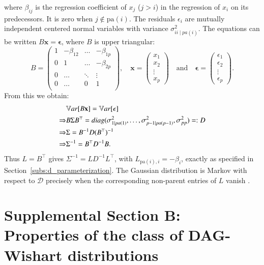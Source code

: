 \documentclass[12pt]{article}
\newcommand{\D}{\mathcal{D}}
\theoremstyle{plain}
\theoremstyle{definition}
\theoremstyle{remark}
\begin{document}
where \(\beta_{ij}\) is the regression coefficient of \(x_j\)
(\(j>i\)) in the regression of \(x_i\) on its predecessors.  It is
zero when \(j\notin\mathrm{pa}(i)\).  The residuals \(\epsilon_i\) are
mutually independent centered normal variables with variance
\(\sigma^2_{ii\mid pa(i)}\).  The equations can be written
\(B\mathbf{x}=\boldsymbol{\epsilon}\), where \(B\) is upper triangular:
\[
B=
\left(
\begin{matrix}
1& -\beta_{12}&\ldots& -\beta_{1p}\\
  0&1 &\ldots &-\beta_{2p}\\
  0&\ldots&\ddots&\vdots \\
 0 &\ldots&0 & 1\\
  \end{matrix}
\right)
,\quad \mathbf{x}=\left(\begin{matrix}x_1\\x_2\\\vdots\\ x_{p}\end{matrix}\right)
\quad\text{and}\quad\boldsymbol{\epsilon}=\left(\begin{matrix}\epsilon_1\\\epsilon_2\\\vdots\\ \epsilon_{p}\end{matrix}\right).
\]
From this we obtain:
\begin{align}
\notag
&\mathbb{V}ar[B\mathbf{x}]=\mathbb{V}ar[\mathbf{\epsilon}]\\
\notag\Rightarrow& B\Sigma B^{\top}=diag(\sigma^2_{1|pa(1)}, \ldots, \sigma^2_{p-1|pa(p-1)}, \sigma^2_{pp})=: D\\
\notag
\Rightarrow& \Sigma= B^{-1}D(B^{\top})^{-1}\\
\Rightarrow& \Sigma^{-1}= B^{\top}D^{-1}B.\label{eq: choleskyd}
\end{align}
Thus \(L=B^\top\) gives
\(\Sigma^{-1}=LD^{-1}L^\top\), with
\(L_{\mathrm{pa}(i),i}=-\beta_i\), exactly as specified in
Section~\ref{subs:d_parameterization}.  The Gaussian distribution is
Markov with respect to \(\D\) precisely when the corresponding
non-parent entries of \(L\) vanish \cite{wermuth80}.
%


\section*{Supplemental Section B: Properties of the class of DAG-Wishart distributions}
\end{document}
